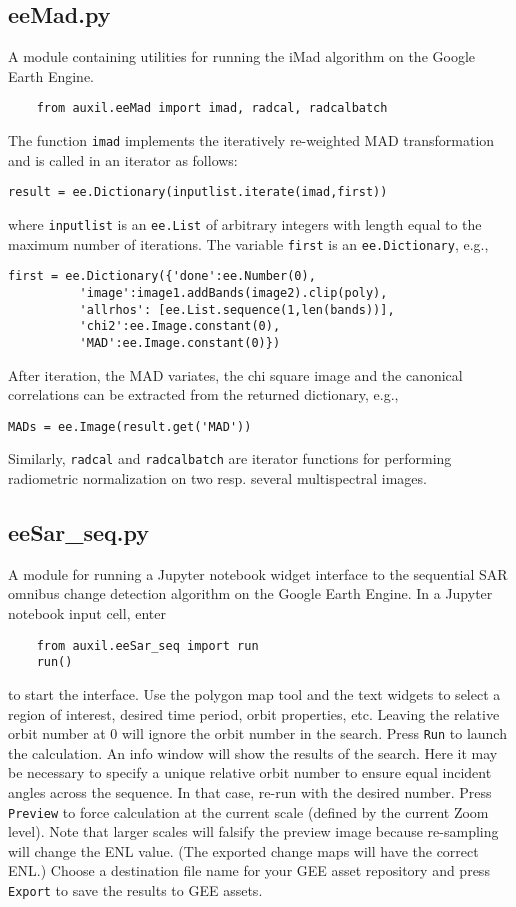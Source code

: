 \documentclass{paper}
\begin{document}
\subsection*{eeMad.py}
A module containing utilities for running the iMad algorithm on the Google Earth Engine.
\begin{verbatim}
    from auxil.eeMad import imad, radcal, radcalbatch
\end{verbatim}
The function {\tt imad} implements the iteratively re-weighted MAD transformation and is called in an iterator as follows:
\begin{lstlisting}
result = ee.Dictionary(inputlist.iterate(imad,first))
\end{lstlisting}
where {\tt inputlist} is an {\tt ee.List} of arbitrary integers with length equal to the maximum number of iterations. The variable {\tt first} is an {\tt ee.Dictionary}, e.g.,
\begin{lstlisting}
first = ee.Dictionary({'done':ee.Number(0),
          'image':image1.addBands(image2).clip(poly),
          'allrhos': [ee.List.sequence(1,len(bands))],
          'chi2':ee.Image.constant(0),
          'MAD':ee.Image.constant(0)})
\end{lstlisting}
After iteration, the MAD variates, the chi square image and the canonical correlations can be extracted from the returned dictionary, e.g.,
\begin{lstlisting}
MADs = ee.Image(result.get('MAD'))
\end{lstlisting}
Similarly,  {\tt radcal} and {\tt radcalbatch} are iterator functions for performing radiometric normalization on two resp. several multispectral images.




\subsection*{eeSar\_seq.py}
A module for running a Jupyter notebook widget interface to the sequential SAR omnibus change detection algorithm on the Google Earth Engine. In a Jupyter notebook input cell, enter
\begin{verbatim}
    from auxil.eeSar_seq import run
    run()
\end{verbatim}
to start the interface. Use the polygon map tool and the text widgets to select a region of interest, desired time period, orbit properties, etc. Leaving the relative orbit number at 0 will ignore the orbit number in the search. Press {\tt Run} to launch the calculation. An info window will show the results  of the search. Here it may be necessary to specify a unique relative orbit number to ensure equal incident angles across the sequence. In that case, re-run with the desired number. Press {\tt Preview} to force calculation at the current scale (defined by the current Zoom level). Note that larger scales will falsify the preview image because re-sampling will change the ENL value. (The exported change maps will have the correct ENL.) Choose a destination file name for your GEE asset repository and press {\tt Export} to save the results to GEE assets.
\end{document}
